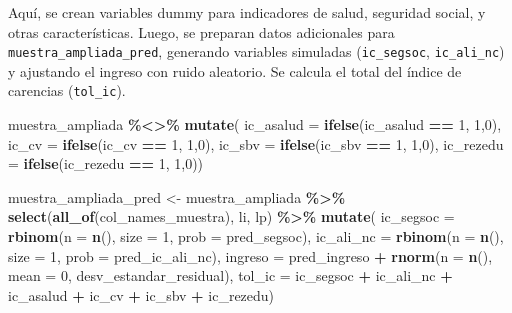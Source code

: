 \documentclass[
  12pt,
]{book}
\newenvironment{Shaded}{\begin{snugshade}}{\end{snugshade}}
\newcommand{\AttributeTok}[1]{\textcolor[rgb]{0.13,0.29,0.53}{#1}}
\newcommand{\DecValTok}[1]{\textcolor[rgb]{0.00,0.00,0.81}{#1}}
\newcommand{\FunctionTok}[1]{\textcolor[rgb]{0.13,0.29,0.53}{\textbf{#1}}}
\newcommand{\NormalTok}[1]{#1}
\newcommand{\OtherTok}[1]{\textcolor[rgb]{0.56,0.35,0.01}{#1}}
\newcommand{\SpecialCharTok}[1]{\textcolor[rgb]{0.81,0.36,0.00}{\textbf{#1}}}
\begin{document}
Aquí, se crean variables dummy para indicadores de salud, seguridad social, y otras características. Luego, se preparan datos adicionales para \texttt{muestra\_ampliada\_pred}, generando variables simuladas (\texttt{ic\_segsoc}, \texttt{ic\_ali\_nc}) y ajustando el ingreso con ruido aleatorio. Se calcula el total del índice de carencias (\texttt{tol\_ic}).

\begin{Shaded}
\begin{Highlighting}[]
\NormalTok{muestra\_ampliada }\SpecialCharTok{\%\textless{}\textgreater{}\%} \FunctionTok{mutate}\NormalTok{(}
  \AttributeTok{ic\_asalud =} \FunctionTok{ifelse}\NormalTok{(ic\_asalud }\SpecialCharTok{==} \DecValTok{1}\NormalTok{, }\DecValTok{1}\NormalTok{,}\DecValTok{0}\NormalTok{),}
  \AttributeTok{ic\_cv =} \FunctionTok{ifelse}\NormalTok{(ic\_cv }\SpecialCharTok{==} \DecValTok{1}\NormalTok{, }\DecValTok{1}\NormalTok{,}\DecValTok{0}\NormalTok{),}
  \AttributeTok{ic\_sbv =} \FunctionTok{ifelse}\NormalTok{(ic\_sbv }\SpecialCharTok{==} \DecValTok{1}\NormalTok{, }\DecValTok{1}\NormalTok{,}\DecValTok{0}\NormalTok{),}
  \AttributeTok{ic\_rezedu =} \FunctionTok{ifelse}\NormalTok{(ic\_rezedu }\SpecialCharTok{==} \DecValTok{1}\NormalTok{, }\DecValTok{1}\NormalTok{,}\DecValTok{0}\NormalTok{)) }

\NormalTok{muestra\_ampliada\_pred }\OtherTok{\textless{}{-}}
\NormalTok{  muestra\_ampliada }\SpecialCharTok{\%\textgreater{}\%}
  \FunctionTok{select}\NormalTok{(}\FunctionTok{all\_of}\NormalTok{(col\_names\_muestra), li, lp) }\SpecialCharTok{\%\textgreater{}\%}
  \FunctionTok{mutate}\NormalTok{(}
    \AttributeTok{ic\_segsoc =} \FunctionTok{rbinom}\NormalTok{(}\AttributeTok{n =} \FunctionTok{n}\NormalTok{(), }\AttributeTok{size =} \DecValTok{1}\NormalTok{, }\AttributeTok{prob =}\NormalTok{ pred\_segsoc),}
    \AttributeTok{ic\_ali\_nc =} \FunctionTok{rbinom}\NormalTok{(}\AttributeTok{n =} \FunctionTok{n}\NormalTok{(), }\AttributeTok{size =} \DecValTok{1}\NormalTok{, }\AttributeTok{prob =}\NormalTok{ pred\_ic\_ali\_nc),}
    \AttributeTok{ingreso =}\NormalTok{ pred\_ingreso }\SpecialCharTok{+} \FunctionTok{rnorm}\NormalTok{(}\AttributeTok{n =} \FunctionTok{n}\NormalTok{(), }\AttributeTok{mean =} \DecValTok{0}\NormalTok{, desv\_estandar\_residual),}
    \AttributeTok{tol\_ic =}\NormalTok{ ic\_segsoc }\SpecialCharTok{+}\NormalTok{ ic\_ali\_nc }\SpecialCharTok{+}\NormalTok{ ic\_asalud }\SpecialCharTok{+}\NormalTok{ ic\_cv }\SpecialCharTok{+}
\NormalTok{      ic\_sbv }\SpecialCharTok{+}\NormalTok{ ic\_rezedu)}
\end{Highlighting}
\end{Shaded}
\end{document}
